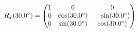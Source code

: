 \documentclass[preview]{standalone}
\begin{document}
\begin{align*}
\special{dvisvgm:raw <g id='unique000'>}R_x(30.0^\circ) = \begin{pmatrix} 1 & 0 & 0 \\ 0 & \cos(30.0^\circ) & -\sin(30.0^\circ) \\ 0 & \sin(30.0^\circ) & \cos(30.0^\circ) \end{pmatrix}\special{dvisvgm:raw </g>}
\end{align*}
\end{document}
